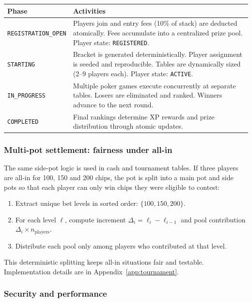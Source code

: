 \documentclass[11pt,a4paper]{article}
\begin{document}
\begin{center}
\begin{tabular}{@{}p{3.5cm}p{9cm}@{}}
\toprule
\textbf{Phase} & \textbf{Activities} \\
\midrule
\texttt{REGISTRATION\_OPEN} & Players join and entry fees (10\% of stack) are deducted atomically. Fees accumulate into a centralized prize pool. Player state: \texttt{REGISTERED}. \\
\texttt{STARTING} & Bracket is generated deterministically. Player assignment is seeded and reproducible. Tables are dynamically sized (2--9 players each). Player state: \texttt{ACTIVE}. \\
\texttt{IN\_PROGRESS} & Multiple poker games execute concurrently at separate tables. Losers are eliminated and ranked. Winners advance to the next round. \\
\texttt{COMPLETED} & Final rankings determine XP rewards and prize distribution through atomic updates. \\
\bottomrule
\end{tabular}
\end{center}

\subsubsection{Multi-pot settlement: fairness under all-in}

The same side-pot logic is used in cash and tournament tables. If three players are all-in for 100, 150 and 200 chips, the pot is split into a main pot and side pots so that each player can only win chips they were eligible to contest:

\begin{enumerate}
\item Extract unique bet levels in sorted order: $\{100, 150, 200\}$.
\item For each level $\ell$, compute increment $\Delta_i = \ell_i - \ell_{i-1}$ and pool contribution $\Delta_i \times n_{\text{players}}$.
\item Distribute each pool only among players who contributed at that level.
\end{enumerate}

This deterministic splitting keeps all-in situations fair and testable. Implementation details are in Appendix~\ref{app:tournament}.

\subsubsection{Security and performance}
\end{document}
